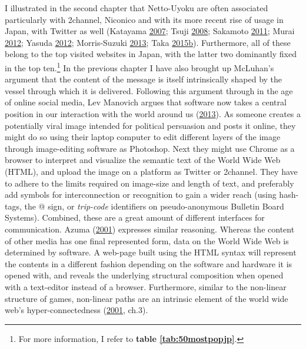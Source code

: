 \documentclass[10pt,british,A4paper,,openany]{memoir}
\begin{document}
I illustrated in the second chapter that Netto-Uyoku are often
associated particularly with 2channel, Niconico and with its more recent
rise of usage in Japan, with Twitter as well (Katayama
\protect\hyperlink{ref-katayama_2-channel_2007}{2007}; Tsuji
\protect\hyperlink{ref-tsuji_eng:_2008}{2008}; Sakamoto
\protect\hyperlink{ref-sakamoto_koreans_2011}{2011}; Murai
\protect\hyperlink{ref-murai_net_2012}{2012}; Yasuda
\protect\hyperlink{ref-yasuda_eng:_2012}{2012}; Morris-Suzuki
\protect\hyperlink{ref-morris-suzuki_freedom_2013}{2013}; Taka
\protect\hyperlink{ref-taka_twitter_2015-1}{2015}\protect\hyperlink{ref-taka_twitter_2015-1}{b}).
Furthermore, all of these belong to the top visited websites in Japan,
with the latter two dominantly fixed in the top ten.\footnote{For more
  information, I refer to \textbf{table \ref{tab:50mostpopjp}}.} In the
previous chapter I have also brought up McLuhan's argument that the
content of the message is itself intrinsically shaped by the vessel
through which it is delivered. Following this argument through in the
age of online social media, Lev Manovich argues that software now takes
a central position in our interaction with the world around us
(\protect\hyperlink{ref-manovich_software_2013}{2013}). As someone
creates a potentially viral image intended for political persuasion and
posts it online, they might do so using their laptop computer to edit
different layers of the image through image-editing software as
Photoshop. Next they might use Chrome as a browser to interpret and
visualize the semantic text of the World Wide Web (HTML), and upload the
image on a platform as Twitter or 2channel. They have to adhere to the
limits required on image-size and length of text, and preferably add
symbols for interconnection or recognition to gain a wider reach (using
hash-tags, the @ sign, or \emph{trip-code} identifiers on
pseudo-anonymous Bulletin Board Systems). Combined, these are a great
amount of different interfaces for communication. Azuma
(\protect\hyperlink{ref-azuma_otaku:_2001}{2001}) expresses similar
reasoning. Whereas the content of other media has one final represented
form, data on the World Wide Web is determined by software. A web-page
built using the HTML syntax will represent the contents in a different
fashion depending on the software and hardware it is opened with, and
reveals the underlying structural composition when opened with a
text-editor instead of a browser. Furthermore, similar to the non-linear
structure of games, non-linear paths are an intrinsic element of the
world wide web's hyper-connectedness
(\protect\hyperlink{ref-azuma_otaku:_2001}{2001}, ch.3).
\end{document}
